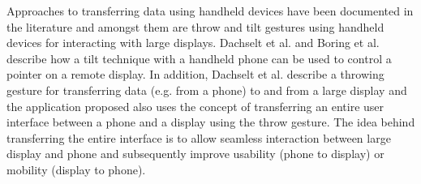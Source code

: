 
Approaches to transferring data using handheld devices have been documented in the literature and amongst them are throw and tilt gestures using handheld devices for interacting with large displays.
Dachselt et al. \cite{Dachselt:2008} and Boring et al. \cite{Boring:2009} describe how a tilt technique with a handheld phone can be used to control a pointer on a remote display.
In addition, Dachselt et al. describe a throwing gesture for transferring data (e.g. from a phone) to and from a large display and the application proposed also uses the concept of transferring an entire user interface between a phone and a display using the throw gesture.
The idea behind transferring the entire interface is to allow seamless interaction between large display and phone and subsequently improve usability (phone to display) or mobility (display to phone).
